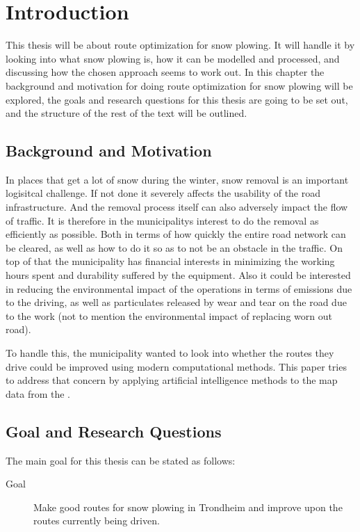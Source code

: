 \chapter{Introduction}

This thesis will be about route optimization for snow plowing. It will handle it by looking into what snow plowing is, how it can be modelled and processed, and discussing how the chosen approach seems to work out. In this chapter the background and motivation for doing route optimization for snow plowing will be explored, the goals and research questions for this thesis are going to be set out, and the structure of the rest of the text will be outlined.

\section{Background and Motivation}

In places that get a lot of snow during the winter, snow removal is an important logisitcal challenge. If not done it severely affects the usability of the road infrastructure. And the removal process itself can also adversely impact the flow of traffic. It is therefore in the municipalitys interest to do the removal as efficiently as possible. Both in terms of how quickly the entire road network can be cleared, as well as how to do it so as to not be an obstacle in the traffic. On top of that the municipality has financial interests in minimizing the working hours spent and durability suffered by the equipment. Also it could be interested in reducing the environmental impact of the operations in terms of emissions due to the driving, as well as particulates released by wear and tear on the road due to the work (not to mention the environmental impact of replacing worn out road).

To handle this, the municipality wanted to look into whether the routes they drive could be improved using modern computational methods. This paper tries to address that concern by applying artificial intelligence methods to the map data from the .

\section{Goal and Research Questions}

The main goal for this thesis can be stated as follows:

\begin{description}
	\item [Goal] Make good routes for snow plowing in Trondheim and improve upon the routes currently being driven.
\end{description}

